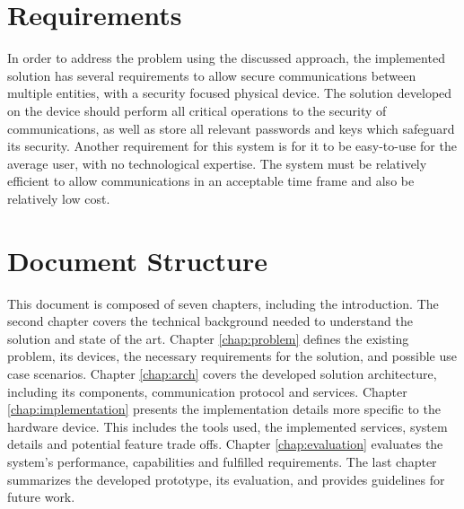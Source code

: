 \section{Requirements}\label{chap:intro:requirements}

In order to address the problem using the discussed approach, the implemented solution has several requirements to allow secure communications between multiple entities, with a security focused physical device.
The solution developed on the device should perform all critical operations to the security of communications, as well as store all relevant passwords and keys which safeguard its security. Another requirement for this system is for it to be easy-to-use for the average user, with no technological expertise. The system must be relatively efficient to allow communications in an acceptable time frame and also be relatively low cost.

\section{Document Structure}\label{chap:intro:doc}

This document is composed of seven chapters, including the introduction. The second chapter covers the technical background needed to understand the solution and state of the art.
Chapter \ref{chap:problem} defines the existing problem, its devices, the necessary requirements for the solution, and possible use case scenarios.
Chapter \ref{chap:arch} covers the developed solution architecture, including its components, communication protocol and services.
Chapter \ref{chap:implementation} presents the implementation details more specific to the hardware device. This includes the tools used, the implemented services, system details and potential feature trade offs. Chapter \ref{chap:evaluation} evaluates the system's performance, capabilities and fulfilled requirements. The last chapter summarizes the developed prototype, its evaluation, and provides guidelines for future work.

